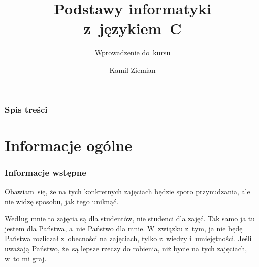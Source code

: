 \documentclass[10pt,t]{beamer}
\title{Podstawy informatyki z~językiem~C}
\subtitle{Wprowadzenie do~kursu}
\author{Kamil Ziemian}
\begin{document}





\RaggedRight





\maketitle





\begin{frame}
  \frametitle{Spis treści}


  \tableofcontents

\end{frame}





\section{Informacje ogólne}



\begin{frame}
  \frametitle{Informacje wstępne}


  Obawiam~się, że na tych konkretnych zajęciach będzie sporo przynudzania,
  ale nie widzę sposobu, jak tego uniknąć.

  Według mnie to zajęcia są dla studentów, nie studenci dla zajęć. Tak samo
  ja tu jestem dla Państwa, a~nie Państwo dla mnie. W~związku z~tym, ja nie
  będę Państwa rozliczał z~obecności na zajęciach, tylko z~wiedzy
  i~umiejętności. Jeśli uważają Państwo, że~są lepsze rzeczy do robienia,
  niż bycie na tych zajęciach, w~to mi graj.

\end{frame}
\end{document}
